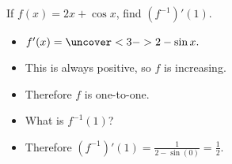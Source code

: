 \begin{frame}
\begin{example}[Example 7, p. 390]
If $f(x) = 2x + \cos x$, find $(f^{-1})'(1)$.
\begin{itemize}
\item<2->  $f'(x) = \uncover<3->{2 -\sin x .}$
\item<4->  This is always positive, so $f$ is increasing.
\item<5->  Therefore $f$ is one-to-one.
\item<6->  What is $f^{-1}(1)$?  
\item<8->  Therefore $(f^{-1})'(1) = \frac{1}{2 - \sin (0)} = \frac{1}{2}$.
\end{itemize}
\end{example}
\end{frame}
